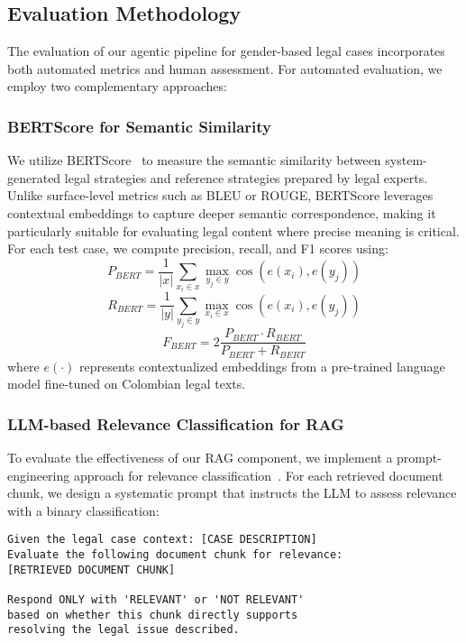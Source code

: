 \subsection{Evaluation Methodology}
The evaluation of our agentic pipeline for gender-based legal cases 
incorporates both automated metrics and human assessment. For automated 
evaluation, we employ two complementary approaches:
\subsubsection{BERTScore for Semantic Similarity}
We utilize BERTScore~\cite{zhang2020bertscoreevaluatingtextgeneration} to measure the semantic similarity between system-generated legal strategies and reference strategies prepared by legal experts. Unlike surface-level metrics such as BLEU or ROUGE, 
BERTScore leverages contextual embeddings to capture deeper semantic 
correspondence, making it particularly suitable for evaluating legal 
content where precise meaning is critical. For each test case, we compute 
precision, recall, and F1 scores using:
\begin{equation}
P_{BERT} = \frac{1}{|x|}\sum_{x_i \in x}\max_{y_j \in y}\cos(e(x_i), e(y_j))
\end{equation}
\begin{equation}
R_{BERT} = \frac{1}{|y|}\sum_{y_j \in y}\max_{x_i \in x}\cos(e(x_i), e(y_j))
\end{equation}
\begin{equation}
F_{BERT} = 2\frac{P_{BERT} \cdot R_{BERT}}{P_{BERT} + R_{BERT}}
\end{equation}
where $e(\cdot)$ represents contextualized embeddings from a pre-trained language model fine-tuned on Colombian legal texts.

\subsubsection{LLM-based Relevance Classification for RAG}
To evaluate the effectiveness of our RAG component, we implement a 
prompt-engineering approach for relevance classification~\cite{es2023ragasautomatedevaluationretrieval}. 
For each retrieved document chunk, we design a systematic prompt 
that instructs the LLM to assess relevance with a binary classification:

\begin{verbatim}
Given the legal case context: [CASE DESCRIPTION]
Evaluate the following document chunk for relevance:
[RETRIEVED DOCUMENT CHUNK]

Respond ONLY with 'RELEVANT' or 'NOT RELEVANT' 
based on whether this chunk directly supports 
resolving the legal issue described.
\end{verbatim}

